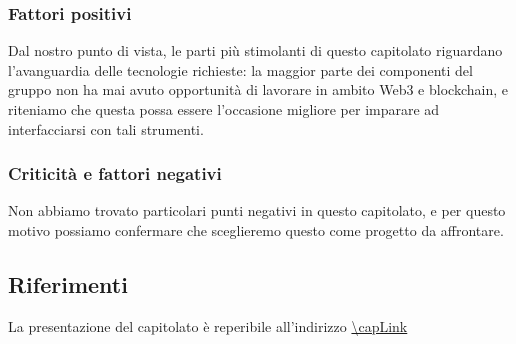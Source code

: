 \subsubsection{Fattori positivi}

 Dal nostro punto di vista, le parti più stimolanti di questo capitolato riguardano l'avanguardia delle tecnologie richieste: la maggior parte dei componenti del gruppo non ha mai avuto opportunità di lavorare in ambito Web3 e blockchain, e riteniamo che questa possa essere l'occasione migliore per imparare ad interfacciarsi con tali strumenti.

\subsubsection{Criticità e fattori negativi}

Non abbiamo trovato particolari punti negativi in questo capitolato, e per questo motivo possiamo confermare che sceglieremo questo come progetto da affrontare.
\subsection{Riferimenti}
La presentazione del capitolato è reperibile all'indirizzo \url{\capLink}